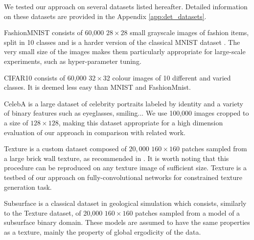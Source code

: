 We tested our approach on several datasets listed hereafter. Detailed  information on these datasets are provided  in the Appendix \ref{app:det_datasets}.
\begin{description}
	\item{FashionMNIST} \citep{Xiao2017} consists of 60,000 $28\times 28$ small grayscale images of fashion items, split in 10 classes and is a harder version of the classical MNIST  dataset \citep{LeCun1998a}. %
	The very small size of the images makes them particularly appropriate for large-scale experiments, such as hyper-parameter tuning. 
	
	\item{CIFAR10} \citep{Krizhevsky2009} consists of 60,000 $32 \times 32$ colour images of 10 different and varied classes. It is deemed less easy than MNIST and FashionMnist.
	\item{CelebA}\citep{Liu2015} is a large dataset of celebrity portraits labeled by identity and a variety of binary features such as eyeglasses, smiling... We use 100,000 images cropped to a size of $128 \times 128$, making this dataset appropriate for a high dimension evaluation of our approach in comparison with related work.
	
	\item{Texture} is a custom dataset 
	composed of $20,000$ $160 \times 160$ patches sampled from a large brick wall texture, as recommended in \citep{Jetchev2017}. It is worth noting that this procedure can be reproduced on any texture image of sufficient size. Texture is a testbed of our approach on fully-convolutional networks for constrained texture generation task. 
	
	\item{Subsurface} is a classical dataset in geological simulation \citep{Strebelle2002} which consists, similarly to the Texture dataset, of 20,000  $160 \times 160$ patches sampled from a model of a subsurface binary domain. These models are assumed to have the same properties as a texture, mainly the property of global ergodicity of the data.
	
	
\end{description}

